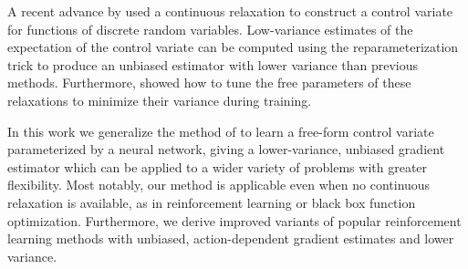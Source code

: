 \documentclass{article}
\begin{document}
A recent advance by \citet{tucker2017rebar} used a continuous relaxation to construct a control variate for functions of discrete random variables. Low-variance estimates of the expectation of the control variate can be computed using the reparameterization trick to produce an unbiased estimator with lower variance than previous methods.
Furthermore, \citet{tucker2017rebar} showed how to tune the free parameters of these relaxations to minimize their variance during training.

In this work we generalize the method of \citet{tucker2017rebar} to learn a free-form control variate parameterized by a neural network, giving a lower-variance, unbiased gradient estimator which can be applied to a wider variety of problems with greater flexibility.
Most notably, our method is applicable even when no continuous relaxation is available, as in reinforcement learning or black box function optimization.
Furthermore, we derive improved variants of popular reinforcement learning methods with unbiased, action-dependent gradient estimates and lower variance.%

\end{document}

